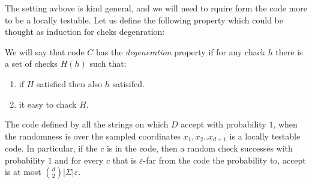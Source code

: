 The setting avbove is kind general, and we will need to rquire form the code more to be a locally testable. Let us define the following property which could be thought as induction for cheks degenration:

\begin{definition}
  We will say that code $C$ has the \textit{degeneration} property if for any chack $h$ there is a set of checks $H\left( h \right)$ such that: 
  \begin{enumerate}
    \item if $H$ satisfied then also $h$ satisifed. 
    \item it easy to chack $H$.  
  \end{enumerate} 
\end{definition}

 

\begin{claim}The code defined by all the strings on which $D$ accept with probability $1$, when the randomness is over the sampled coordinates $x_{1}, x_{2} .. x_{d+1}$ is a locally testable code. In particular, if the $c$ is in the code, then a random check successes with probability $1$ and for every $c$ that is $\varepsilon$-far from the code the probability to, accept  is at most $ { d \choose 2 } |\Sigma| \varepsilon $.  
\end{claim}

